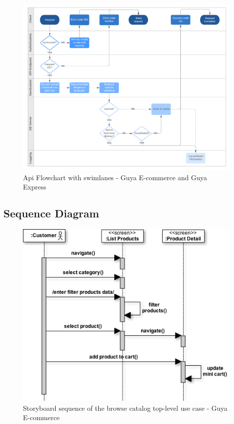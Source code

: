 \clearpage
\begin{figure}[!h]
\hspace*{-3cm}
\includegraphics[width=\paperwidth, height=\paperheight,keepaspectratio]{activity-diagrams/api-flowchart-with-swimlanes}
\caption{Api Flowchart with swimlanes - Guya E-commerce and Guya Express }
\end{figure}
\clearpage



\subsection{Sequence Diagram}
\begin{figure}[!h]
\center
\includegraphics[keepaspectratio, width=15cm]{sequence-diagrams/catalog-storyboard.png}
\caption{Storyboard sequence of the browse catalog top-level use case - Guya E-commerce}
\end{figure}

